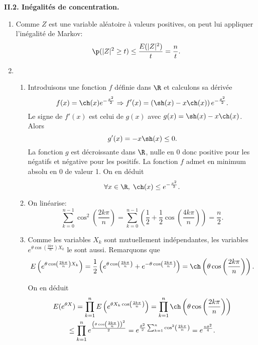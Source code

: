 \textbf{II.2. Inégalités de concentration.}
\begin{enumerate}
  \item Comme $Z$ est une variable aléatoire à valeurs positives, on peut lui appliquer l'inégalité de Markov:
\[
  \p(|Z|^2 \geq t) \leq \frac{E(|Z|^2)}{t} = \frac{n}{t}.
\]

  \item 
  \begin{enumerate}
    \item Introduisons une fonction $f$ définie dans $\R$ et calculons sa dérivée 
\[
  f(x) = \ch(x) e^{-\frac{x^2}{2}}
  \Rightarrow 
  f'(x) = \left( \sh(x) - x\ch(x)\right)e^{-\frac{x^2}{2}}.
\]
Le signe de $f'(x)$ est celui de $g(x)$ avec $g(x) = \sh(x) - x\ch(x)$. Alors
\[
  g'(x) = -x \sh(x) \leq 0.
\]
La fonction $g$ est décroissante dans $\R$, nulle en $0$ donc positive pour les négatifs et négative pour les positifs. La fonction $f$ admet en minimum absolu en $0$ de valeur 1. On en déduit
\[
  \forall x \in \R, \; \ch(x) \leq e^{-\frac{x^2}{2}}.
\]

    \item On linéarise:
\[
  \sum_{k=0}^{n-1}\cos^2\left(\frac{2k\pi}{n} \right)
  =\sum_{k=0}^{n-1}\left( \frac{1}{2} + \frac{1}{2}\cos\left(\frac{4k\pi}{n} \right) \right)
  = \frac{n}{2}.
\]

    \item Comme les variables $X_k$ sont mutuellement indépendantes, les variables $e^{\theta \cos \left( \frac{2k\pi}{n}\right) X_k}$ le sont aussi. Remarquons que 
\[
  E\left(e^{\theta \cos \left( \frac{2k\pi}{n}\right) X_k}\right) 
  = \frac{1}{2}
  \left( 
      e^{\theta \cos \left( \frac{2k\pi}{n}\right)} 
    + e^{-\theta \cos \left( \frac{2k\pi}{n}\right)}
  \right)
  = \ch \left( \theta \cos \left( \frac{2k\pi}{n}\right)\right).
\]
    
    On en déduit
\begin{multline*}
  E(e^{\theta X}) = \prod_{k=1}^{n} 
            E\left(
                   e^{\theta  X_k\cos\left( \frac{2k\pi}{n}\right)}
             \right)
  = \prod_{k=1}^{n} \ch \left( \theta \cos \left( \frac{2k\pi}{n}\right)\right)\\
  \leq \prod_{k=1}^{n} 
      e^{ \frac{
                \left(\theta \cos \left( \frac{2k\pi}{n}\right)\right)^2
               }{2}
        }
  = e^{
       \frac{\theta^2}{2}\sum_{k=1}^{n} \cos^2 \left( \frac{2k\pi}{n}\right)
      }
  = e^{\frac{n\theta^2}{4}}.
\end{multline*}

  \end{enumerate}


\end{enumerate}
